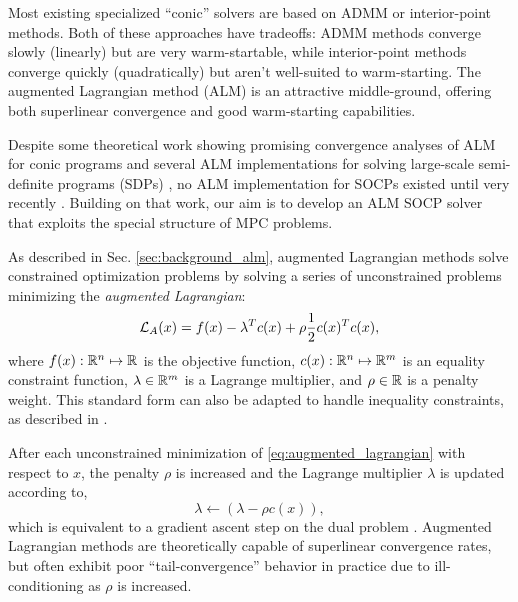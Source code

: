 \documentclass[../root.tex]{subfiles}
\begin{document}
    Most existing specialized ``conic'' solvers are based on ADMM
    \cite{garstka_COSMO_2019,odonoghue_Conic_2016} or interior-point
    \cite{domahidi_ECOS_2013} methods. Both of these approaches have tradeoffs:
    ADMM methods converge slowly (linearly) but are very warm-startable,
    while interior-point methods converge quickly (quadratically) but aren't
    well-suited to warm-starting. The augmented Lagrangian method (ALM) is an
    attractive middle-ground, offering both superlinear convergence and good
    warm-starting capabilities.
    
    Despite some theoretical work showing promising convergence analyses of
    ALM for conic programs 
    \cite{liu_Convergence_2008,shapiro_Properties_2004,sun_rate_2008,cui_Rsuperlinear_2019,hang_Augmented_2020}
    and several ALM
    implementations for solving large-scale semi-definite programs (SDPs)
    \cite{zhao_NewtonCG_2010,li_QSDPNAL_2018}, no ALM implementation for SOCPs
    existed until very recently \cite{liang_Inexact_2020}.
    Building on that work, our aim is to develop an ALM SOCP solver that
    exploits the special structure of MPC problems.

    As described in Sec. \ref{sec:background_alm}, augmented Lagrangian
    methods solve constrained optimization problems by solving a series of
    unconstrained problems minimizing the
    \textit{augmented Lagrangian}:
    \begin{equation} \label{eq:augmented_lagrangian}
        \mathcal{L}_A(x) = f(x) - \lambda^T c(x) + \rho \frac{1}{2} c(x)^T c(x),
    \end{equation}
    where $f(x) : \mathbb{R}^{n} \mapsto \mathbb{R}^{}$ is the objective function, $c(x) : \mathbb{R}^{n}
    \mapsto \mathbb{R}^{m}$ is an equality constraint function, $\lambda \in \mathbb{R}^{m}$ is a
    Lagrange multiplier, and $\rho \in \mathbb{R}$ is a penalty weight. This standard
    form can also be adapted to handle inequality constraints, as described
    in \cite{howell_ALTRO_2019} \cite{toussaint_Novel_2014}.
    
    After each unconstrained minimization of \eqref{eq:augmented_lagrangian}
    with respect to $x$, the penalty $\rho$ is increased and the Lagrange
    multiplier $\lambda$ is updated according to,
    \begin{equation} \label{eq:al_dual_update2}
        \lambda \gets \left( \lambda - \rho c(x) \right) ,
    \end{equation}
    which is equivalent to a gradient ascent step on the dual problem \cite{bertsekas_Constrained_1996}.
    Augmented Lagrangian methods are theoretically capable of superlinear
    convergence rates, but often exhibit poor ``tail-convergence'' behavior
    in practice due to ill-conditioning as $\rho$ is increased.
    
\end{document}
